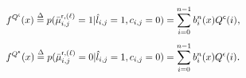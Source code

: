 \documentclass[journal]{IEEEtran}
\newcommand{\mep}{{x}}
\newcommand{\row}{\mathsf{r}}
\newcommand{\Pue}{P^{\mathsf{e}}}
\newcommand{\Que}{Q^{\mathsf{e}}}
\newcommand{\Puc}{P^{\mathsf{c}}}
\newcommand{\Quc}{Q^{\mathsf{c}}}
\newcommand{\Puep}{P^{\mathsf{\epsilon}}}
\newcommand{\Quep}{Q^{\mathsf{\epsilon}}}
\let\originalleft\left
\let\originalright\right
\renewcommand{\left}{\mathopen{}\mathclose\bgroup\originalleft}
\renewcommand{\right}{\aftergroup\egroup\originalright}
\newcommand\scalemath[2]{\scalebox{#1}{\mbox{\ensuremath{\displaystyle #2}}}}   %
\begin{document}
\begin{align}\label{qc} 
\scalemath{0.86}{f^{\Quc}(\mep)  \buildrel \Delta \over  =  p(\bar \mu _{i,j}^{\row,(\ell )}=1|{\hat l_{i,j}}=1,c_{i,j}=0)   =  \sum\limits_{i = 0}^{n - 1}   b^{n}_i(x)  {\Quc\left( i \right)}},
\end{align}
\begin{align}\label{q_ep} 
\scalemath{0.86}{f^{\Quep}(\mep)  \buildrel \Delta \over  =  p(\bar \mu _{i,j}^{\row,(\ell )}=0|{\hat l_{i,j}}=1,c_{i,j}=0)  =  \sum\limits_{i = 0}^{n - 1}   b^{n}_i(x)  {\Quep\left( i \right)}}.
\end{align}
%
\end{document}
